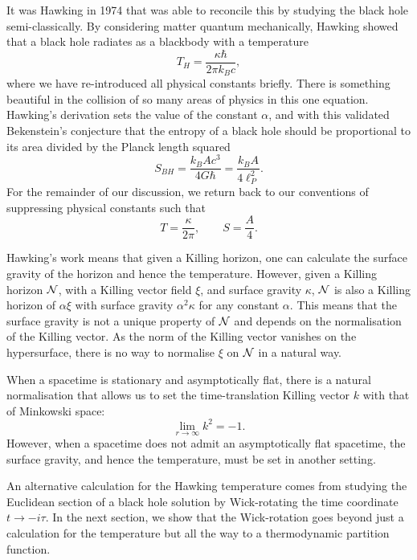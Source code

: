 It was Hawking in 1974 \cite{Hawking:1974sw} that was able to reconcile this by studying the black hole semi-classically. By considering matter quantum mechanically, Hawking showed that a black hole radiates as a blackbody with a temperature
\begin{equation}
\label{eq:hawkingtemp}
	T_H = \frac{\kappa \hbar}{2\pi k_B c},
\end{equation}
where we have re-introduced all physical constants briefly. There is something beautiful in the collision of so many areas of physics in this one equation. Hawking's derivation sets the value of the constant $\alpha$, and with this validated Bekenstein's conjecture that the entropy of a black hole should be proportional to its area divided by the Planck length squared \cite{Bekenstein:1973ur}
\begin{equation}
\label{eq:bhentropy}
	S_{BH} = \frac{k_B A c^3}{4 G \hbar} = \frac{k_B A}{4 \ell_P^2}.
\end{equation}
For the remainder of our discussion, we return back to our conventions of suppressing physical constants such that
\begin{equation*}
	T = \frac{\kappa}{2\pi}, \qquad S = \frac{A}{4}.
\end{equation*}

Hawking's work means that given a Killing horizon, one can calculate the surface gravity of the horizon and hence the temperature. However, given a Killing horizon ${\cal N}$, with a Killing vector field $\xi$, and surface gravity $\kappa$, ${\cal N}$ is also a Killing horizon of $\alpha \xi$ with surface gravity $\alpha^2 \kappa$ for any constant $\alpha$. This means that the surface gravity is not a unique property of ${\cal N}$ and depends on the normalisation of the Killing vector. As the norm of the Killing vector vanishes on the hypersurface, there is no way to normalise $\xi$ on ${\cal N}$ in a natural way.

When a spacetime is stationary and asymptotically flat, there is a natural normalisation that allows us to set the time-translation Killing vector $k$ with that of Minkowski space:
\begin{equation*}
	\lim_{r \rightarrow \infty} k^2 = -1.
\end{equation*}   
However, when a spacetime does not admit an asymptotically flat spacetime, the surface gravity, and hence the temperature, must be set in another setting.

An alternative calculation for the Hawking temperature comes from studying the Euclidean section of a black hole solution by Wick-rotating the time coordinate $t \rightarrow -i \tau$. In the next section, we show that the Wick-rotation goes beyond just a calculation for the temperature but all the way to a thermodynamic partition function.

